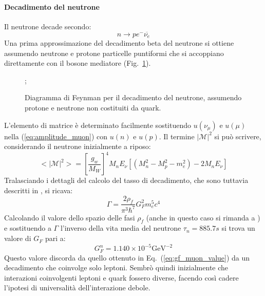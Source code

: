 \documentclass{subnucbo}
\begin{document}
\paragraph{Decadimento del neutrone}
Il neutrone decade secondo:
\begin{equation}
        n \rightarrow p e^{-} \overline{\nu_{e}}
        \label{eq:neutron_decay}
\end{equation}
Una prima approssimazione del decadimento beta del neutrone si ottiene assumendo neutrone e protone particelle puntiformi che si accoppiano direttamente con il bosone mediatore (Fig.~\ref{fig:neutron_decay_simple}).
\begin{figure}[!h]
        \centering
        ;
        \caption{Diagramma di Feynman per il decadimento del neutrone, assumendo protone e neutrone non costituiti da quark.}
        \label{fig:neutron_decay_simple}
\end{figure}
L'elemento di matrice è determinato facilmente sostituendo $u(\nu_{\mu})$ e $u(\mu)$ nella (\ref{eq:amplitude_muon}) con $u(n)$ e $u(p)$. Il termine $|\mathcal{M}|^{2}$ si può scrivere, considerando il neutrone inizialmente a riposo:
\begin{equation}
        < | \mathcal { M } | ^ { 2 } > = \left[ \frac { g _ { w } } { M _ { W } } \right] ^ { 4 } M _ { n } E _ { \nu } \left[ \left( M _ { n } ^ { 2 } - M _ { p } ^ { 2 } - m _ { e } ^ { 2 } \right) - 2 M _ { n } E _ { \nu } \right]
\end{equation}
Tralasciando i dettagli del calcolo del tasso di decadimento, che sono tuttavia descritti in \cite{ref:hayes}, si ricava:
\begin{equation}
        \Gamma = \frac { 2 \rho_{f} } { \pi ^ { 3 } \hbar ^ { 7 } } G _ { F } ^ { 2 } m _ { e } ^ { 5 } c ^ { 4 }
        \label{eq:neutron_decay_rate}
\end{equation}
Calcolando il valore dello spazio delle fasi $\rho_{f}$ (anche in questo caso si rimanda a \cite{ref:hayes}) e sostituendo a $\Gamma$ l'inverso della vita media del neutrone $\tau_{n}=885.7 s$ si trova un valore di $G_{F}$ pari a:
\begin{equation}
        G^{n} _ { F } = 1.140 \times 10 ^ { - 5 } \mathrm { GeV } ^ { - 2 }
        \label{eq:gf_neutron_value}
\end{equation}
Questo valore discorda da quello ottenuto in Eq.~(\ref{eq:gf_muon_value}) da un decadimento che coinvolge solo leptoni. Sembrò quindi inizialmente che interazioni coinvolgenti leptoni e quark fossero diverse, facendo così cadere l'ipotesi di universalità dell'interazione debole.
\end{document}
